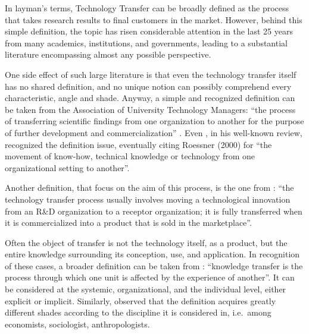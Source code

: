 

\label{Chapter1} %


In layman's terms, Technology Transfer can be broadly defined as the process that takes research results to final customers in the market. However, behind this simple definition, the topic has risen considerable attention in the last 25 years from many academics, institutions, and governments, leading to a substantial literature encompassing almost any possible perspective.

One side effect of such large literature is that even the technology transfer itself has no shared definition, and no unique notion can possibly comprehend every characteristic, angle and shade. Anyway, a simple and recognized definition can be taken from the Association of University Technology Managers: \enquote{the process of transferring scientific findings from one organization to another for the purpose of further development and commercialization} \citep{Genshaft2016}. Even \citet{Bozeman2000}, in his well-known review, recognized the definition issue, eventually citing Roessner (2000) for \enquote{the movement of know-how, technical knowledge or technology from one organizational setting to another}. 

Another definition, that focus on the aim of this process, is the one from \citet{Rogers2001}: \enquote{the technology transfer process usually involves moving a technological innovation from an R\&D organization to a receptor organization; it is fully transferred when it is commercialized into a product that is sold in the marketplace}. 

Often the object of transfer is not the technology itself, as a product, but the entire knowledge surrounding its conception, use, and application. In recognition of these cases, a broader definition can be taken from \citet{Argote2000}: \enquote{knowledge transfer is the process through which one unit is affected by the experience of another}. It can be considered at the systemic, organizational, and the individual level, either explicit or implicit. Similarly, \citet{Zhao1992} observed that the definition acquires greatly different shades according to the discipline it is considered in, i.e.\ among economists, sociologist, anthropologists. 

